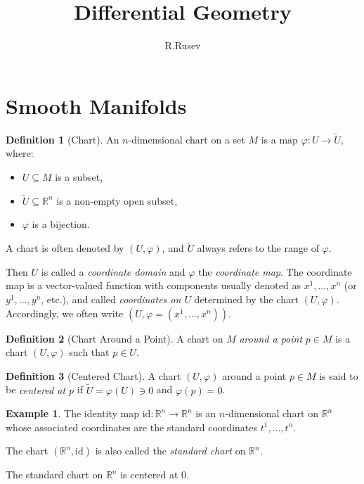 \documentclass[12pt]{article}
\title{\textbf{Differential Geometry}\\[0.5em]}
\author{R.Rusev}
\date{}
\theoremstyle{definition}
\newtheorem{definition}{Definition}[section]
\newtheorem{example}{Example}[section]
\begin{document}
\maketitle

\section{Smooth Manifolds}

\medskip
\begin{definition}[Chart]
An $n$-dimensional chart on a set $M$ is a map $\varphi : U \to \tilde{U}$, where:
\begin{itemize}
    \item $U \subseteq M$ is a subset,
    \item $\tilde{U} \subseteq \mathbb{R}^n$ is a non-empty open subset,
    \item $\varphi$ is a bijection.
\end{itemize}
A chart is often denoted by $(U, \varphi)$, and $\tilde{U}$ always refers to the range of $\varphi$.

Then $U$ is called a \emph{coordinate domain} and $\varphi$ the \emph{coordinate map}. The coordinate map is a vector-valued function with components usually denoted as $x^1, \ldots, x^n$ (or $y^1, \ldots, y^n$, etc.), and called \emph{coordinates on $U$} determined by the chart $(U, \varphi)$. Accordingly, we often write $(U, \varphi = (x^1, \ldots, x^n))$.
\end{definition}

\medskip
\begin{definition}[Chart Around a Point]
A chart on $M$ \emph{around a point} $p \in M$ is a chart $(U, \varphi)$ such that $p \in U$.
\end{definition}

\medskip
\begin{definition}[Centered Chart]
A chart $(U, \varphi)$ around a point $p \in M$ is said to be \emph{centered at $p$} if $\tilde{U} = \varphi(U) \ni 0$ and $\varphi(p) = 0$.
\end{definition}

\medskip
\begin{example}
The identity map $\mathrm{id} : \mathbb{R}^n \to \mathbb{R}^n$ is an $n$-dimensional chart on $\mathbb{R}^n$ whose associated coordinates are the standard coordinates $t^1, \ldots, t^n$.

The chart $(\mathbb{R}^n, \mathrm{id})$ is also called the \emph{standard chart} on $\mathbb{R}^n$.

The standard chart on $\mathbb{R}^n$ is centered at $0$.
\end{example}
\end{document}
